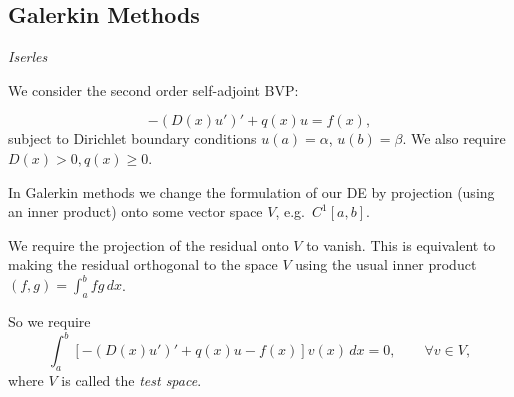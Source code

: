 \documentclass[12pt, a4paper]{article}
\theoremstyle{definition}
\newtheorem{example}[thm]{Example}
\theoremstyle{remark}
\numberwithin{equation}{section}
\begin{document}
%
%
%
%
%
%
%
%

\newpage
\subsection{Galerkin Methods} 
\emph{Iserles  }

We consider the second order self-adjoint BVP:

\begin{equation*}
-(D(x)u')'+q(x)u=f(x),
\end{equation*}
subject to Dirichlet boundary conditions $u(a)=\alpha$, $u(b)=\beta$. We also require $D(x)>0, q(x) \ge 0$.

In Galerkin methods we change the formulation of our DE by projection (using an inner product) onto some vector space $V$, e.g.\ $C^1[a,b]$.

We require the projection of the residual onto $V$ to vanish. This is equivalent to making the residual orthogonal to the space $V$ using the usual inner product $ (f,g)  = \int_a^b fg \, dx$.

So we require
\begin{equation*}
\int_a^b[-(D(x)u')'+q(x)u-f(x)]v(x)\,dx=0, \qquad \forall v \in V,
\end{equation*}
where $V$ is called the \emph{test space}.
\end{document}
